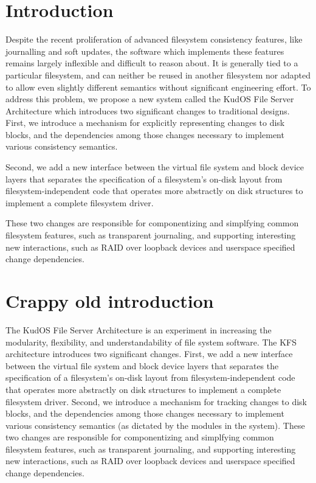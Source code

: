 \section*{Introduction}
\label{sec:intro}

Despite the recent proliferation of advanced filesystem consistency features,
like journalling and soft updates\cite{ganger00soft}, the software which
implements these features remains largely inflexible and difficult to reason
about. It is generally tied to a particular filesystem, and can neither be
reused in another filesystem nor adapted to allow even slightly different
semantics without significant engineering effort. To address this problem, we
propose a new system called the KudOS File Server Architecture which introduces
two significant changes to traditional designs. First, we introduce a mechanism
for explicitly representing changes to disk blocks, and the dependencies among
those changes necessary to implement various consistency semantics.

Second, we add a new interface between the virtual file system and block device
layers that separates the specification of a filesystem's on-disk layout from
filesystem-independent code that operates more abstractly on disk structures to
implement a complete filesystem driver.

These two changes are responsible for componentizing and simplfying common
filesystem features, such as transparent journaling, and supporting interesting
new interactions, such as RAID over loopback devices and userspace specified
change dependencies.

\section*{Crappy old introduction}
The KudOS File Server Architecture is an experiment in increasing the
modularity, flexibility, and understandability of file system software. The KFS
architecture introduces two significant changes. First, we add a new interface
between the virtual file system and block device layers that separates the
specification of a filesystem's on-disk layout from filesystem-independent code
that operates more abstractly on disk structures to implement a complete
filesystem driver. Second, we introduce a mechanism for tracking changes to disk
blocks, and the dependencies among those changes necessary to implement various
consistency semantics (as dictated by the modules in the system). These two
changes are responsible for componentizing and simplfying common filesystem
features, such as transparent journaling, and supporting interesting new
interactions, such as RAID over loopback devices and userspace specified change
dependencies.
